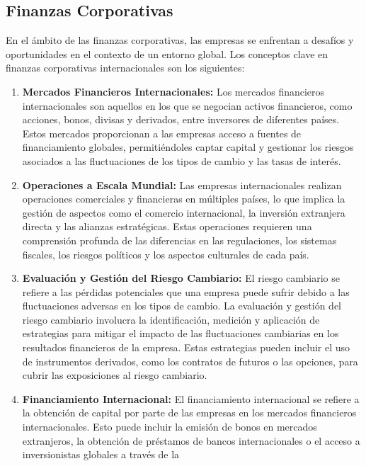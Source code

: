\documentclass[
  a4paper,
]{article}
\begin{document}
\subsection{Finanzas Corporativas}\label{finanzas-corporativas}

En el ámbito de las finanzas corporativas, las empresas se enfrentan a
desafíos y oportunidades en el contexto de un entorno global. Los
conceptos clave en finanzas corporativas internacionales son los
siguientes:

\begin{enumerate}
\def\labelenumi{\arabic{enumi}.}
\item
  \textbf{Mercados Financieros Internacionales:} Los mercados
  financieros internacionales son aquellos en los que se negocian
  activos financieros, como acciones, bonos, divisas y derivados, entre
  inversores de diferentes países. Estos mercados proporcionan a las
  empresas acceso a fuentes de financiamiento globales, permitiéndoles
  captar capital y gestionar los riesgos asociados a las fluctuaciones
  de los tipos de cambio y las tasas de interés.
\item
  \textbf{Operaciones a Escala Mundial:} Las empresas internacionales
  realizan operaciones comerciales y financieras en múltiples países, lo
  que implica la gestión de aspectos como el comercio internacional, la
  inversión extranjera directa y las alianzas estratégicas. Estas
  operaciones requieren una comprensión profunda de las diferencias en
  las regulaciones, los sistemas fiscales, los riesgos políticos y los
  aspectos culturales de cada país.
\item
  \textbf{Evaluación y Gestión del Riesgo Cambiario:} El riesgo
  cambiario se refiere a las pérdidas potenciales que una empresa puede
  sufrir debido a las fluctuaciones adversas en los tipos de cambio. La
  evaluación y gestión del riesgo cambiario involucra la identificación,
  medición y aplicación de estrategias para mitigar el impacto de las
  fluctuaciones cambiarias en los resultados financieros de la empresa.
  Estas estrategias pueden incluir el uso de instrumentos derivados,
  como los contratos de futuros o las opciones, para cubrir las
  exposiciones al riesgo cambiario.
\item
  \textbf{Financiamiento Internacional:} El financiamiento internacional
  se refiere a la obtención de capital por parte de las empresas en los
  mercados financieros internacionales. Esto puede incluir la emisión de
  bonos en mercados extranjeros, la obtención de préstamos de bancos
  internacionales o el acceso a inversionistas globales a través de la

\end{enumerate}
\end{document}
